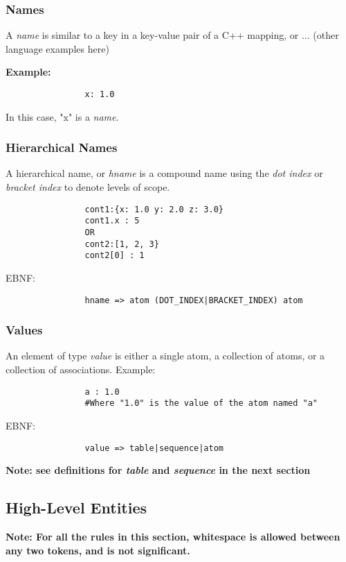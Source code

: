 \documentclass{memarticle}
\begin{document}
		\subsubsection{Names}
			A \emph{name} is similar to a key in a key-value pair of a C++ mapping, or ... (other language examples here)
			\vspace{1mm}
			\par\bf{Example:}
			\rm
			\begin{verbatim}
				x: 1.0
			\end{verbatim}
			\vspace{1mm}
			In this case, 
			"x" is a \emph{name}.
		\subsubsection{Hierarchical Names}
			A hierarchical name,
			or \emph{hname} is a compound name 
			using the \emph{dot index}
			or \emph{bracket index}
			to denote levels of scope.
			\begin{verbatim}
				cont1:{x: 1.0 y: 2.0 z: 3.0}
				cont1.x : 5
				OR
				cont2:[1, 2, 3}
				cont2[0] : 1
			\end{verbatim}
			\vspace{1mm}
			\par
			EBNF:
			\begin{verbatim}
				hname => atom (DOT_INDEX|BRACKET_INDEX) atom
			\end{verbatim}
	
		\subsubsection{Values}
			An element of type \emph{value} is either a single atom, 
			a collection of atoms,
			or a collection of associations.
			Example:
			\begin{verbatim}
				a : 1.0
				#Where "1.0" is the value of the atom named "a"
			\end{verbatim}
			
			\vspace{1mm}
			\par
			EBNF:
			\begin{verbatim}
				value => table|sequence|atom
			\end{verbatim}	
			\vspace{1mm}
			\par
			\bf Note: \rm see definitions for \emph{table} 
			and \emph{sequence} 
			in the next section
	\subsection{High-Level Entities}
		\bf Note: \rm For all the rules in this section,
		whitespace is allowed between any two tokens,
		and is not significant.
						
\end{document}

